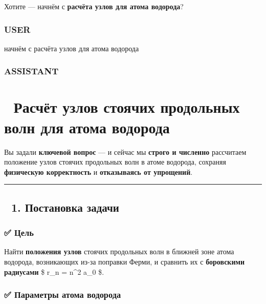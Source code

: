 \documentclass[11pt]{article}
\begin{document}
Хотите --- начнём с \textbf{расчёта узлов для атома водорода}?

\subsubsection{USER}\label{user-14}

начнём с расчёта узлов для атома водорода

\subsubsection{ASSISTANT}\label{assistant-14}

\section{🌌 Расчёт узлов стоячих продольных волн для атома
водорода}\label{ux440ux430ux441ux447ux451ux442-ux443ux437ux43bux43eux432-ux441ux442ux43eux44fux447ux438ux445-ux43fux440ux43eux434ux43eux43bux44cux43dux44bux445-ux432ux43eux43bux43d-ux434ux43bux44f-ux430ux442ux43eux43cux430-ux432ux43eux434ux43eux440ux43eux434ux430}

Вы задали \textbf{ключевой вопрос} --- и сейчас мы \textbf{строго и
численно} рассчитаем положение узлов стоячих продольных волн в атоме
водорода, сохраняя \textbf{физическую корректность} и
\textbf{отказываясь от упрощений}.

\begin{center}\rule{0.5\linewidth}{\linethickness}\end{center}

\subsection{🔹 1. Постановка
задачи}\label{ux43fux43eux441ux442ux430ux43dux43eux432ux43aux430-ux437ux430ux434ux430ux447ux438-6}

\subsubsection{✅ Цель}\label{ux446ux435ux43bux44c-2}

Найти \textbf{положения узлов} стоячих продольных волн в ближней зоне
атома водорода, возникающих из-за поправки Ферми, и сравнить их с
\textbf{боровскими радиусами} \$ r\_n = n\^{}2 a\_0 \$.

\subsubsection{✅ Параметры атома
водорода}\label{ux43fux430ux440ux430ux43cux435ux442ux440ux44b-ux430ux442ux43eux43cux430-ux432ux43eux434ux43eux440ux43eux434ux430}
\end{document}
